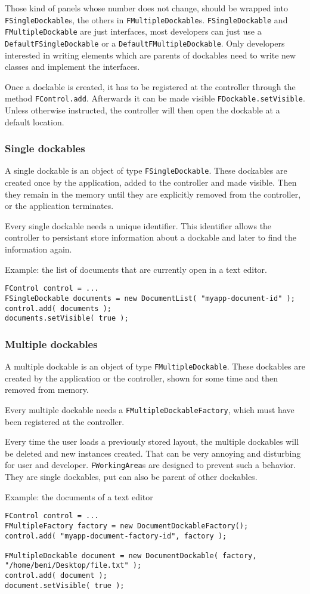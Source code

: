 \documentclass[a4paper,10pt]{article}
\newcommand{\src}[1]{\lstinline[basicstyle=\ttfamily]|#1|}
\begin{document}
Those kind of panels whose number does not change, should be wrapped into \src{FSingleDockable}s, the others in \src{FMultipleDockable}s. \src{FSingleDockable} and \src{FMultipleDockable} are just interfaces, most developers can just use a \src{DefaultFSingleDockable} or a \src{DefaultFMultipleDockable}. Only developers interested in writing elements which are parents of dockables need to write new classes and implement the interfaces.

Once a dockable is created, it has to be registered at the controller through the method \src{FControl.add}. Afterwards it can be made visible \src{FDockable.setVisible}. Unless otherwise instructed, the controller will then open the dockable at a default location.

\subsubsection{Single dockables}
A single dockable is an object of type \src{FSingleDockable}. These dockables are created once by the application, added to the controller and made visible. Then they remain in the memory until they are explicitly removed from the controller, or the application terminates.

Every single dockable needs a unique identifier. This identifier allows the controller to persistant store information about a dockable and later to find the information again.

Example: the list of documents that are currently open in a text editor.
\begin{lstlisting}
FControl control = ...
FSingleDockable documents = new DocumentList( "myapp-document-id" );
control.add( documents );
documents.setVisible( true );
\end{lstlisting}

\subsubsection{Multiple dockables}
A multiple dockable is an object of type \src{FMultipleDockable}. These dockables are created by the application or the controller, shown for some time and then removed from memory.

Every multiple dockable needs a \src{FMultipleDockableFactory}, which must have been registered at the controller.

Every time the user loads a previously stored layout, the multiple dockables will be deleted and new instances created. That can be very annoying and disturbing for user and developer. \src{FWorkingArea}s are designed to prevent such a behavior. They are single dockables, put can also be parent of other dockables.

Example: the documents of a text editor
\begin{lstlisting}
FControl control = ...
FMultipleFactory factory = new DocumentDockableFactory();
control.add( "myapp-document-factory-id", factory );

FMultipleDockable document = new DocumentDockable( factory, "/home/beni/Desktop/file.txt" );
control.add( document );
document.setVisible( true );
\end{lstlisting}
\end{document}
